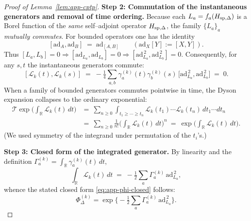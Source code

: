 \documentclass[10pt]{article}
\theoremstyle{definition}
\theoremstyle{plain}
\begin{document}
\begin{proof}[Proof of Lemma~\ref{lem:app-cptp}]
\medskip
\noindent\textbf{Step 2: Commutation of the instantaneous generators and removal of time ordering.}
Because each \(L_a=f_a(H_{{\rm sp},\Delta})\) is a Borel function of the \emph{same} self–adjoint operator
\(H_{{\rm sp},\Delta}\), the family \(\{L_a\}_a\) \emph{mutually commutes}.
For bounded operators one has the identity
\[
[\mathrm{ad}_A,\mathrm{ad}_B]\;=\;\mathrm{ad}_{[A,B]}\qquad(\mathrm{ad}_X[Y]:=[X,Y]).
\]
Thus \([L_a,L_b]=0\Rightarrow [\mathrm{ad}_{L_a},\mathrm{ad}_{L_b}]=0\Rightarrow
[\mathrm{ad}_{L_a}^{\,2},\mathrm{ad}_{L_b}^{\,2}]=0\).
Consequently, for any \(s,t\) the instantaneous generators commute:
\[
[\mathcal L_k(t),\mathcal L_k(s)]\;=\;-\tfrac14\sum_{a,b}\gamma_a^{(k)}(t)\gamma_b^{(k)}(s)\,
\big[\mathrm{ad}_{L_a}^{\,2},\mathrm{ad}_{L_b}^{\,2}\big]\;=\;0.
\]
When a family of bounded generators commutes pointwise in time, the Dyson expansion collapses to the ordinary exponential:
\begin{align*}
\mathcal T\exp\!\Big(\int_{\mathbb R}\!\mathcal L_k(t)\,dt\Big)
&=\ \sum_{n\ge 0}\int_{t_1\ge\cdots\ge t_n}\!\!\!\!\!\!
\mathcal L_k(t_1)\cdots \mathcal L_k(t_n)\,dt_1\cdots dt_n\\
&=\ \sum_{n\ge 0}\frac{1}{n!}\Big(\int_{\mathbb R}\!\mathcal L_k(t)\,dt\Big)^{\!n}
\ =\ \exp\!\Big(\int_{\mathbb R}\!\mathcal L_k(t)\,dt\Big).
\end{align*}
(We used symmetry of the integrand under permutation of the \(t_i\)'s.)

\medskip
\noindent\textbf{Step 3: Closed form of the integrated generator.}
By linearity and the definition \(\Gamma_a^{(k)}=\int_{\mathbb R}\gamma_a^{(k)}(t)\,dt\),
\[
\int_{\mathbb R}\!\mathcal L_k(t)\,dt
\;=\;-\tfrac12\sum_a \Gamma_a^{(k)}\,\mathrm{ad}_{L_a}^{\,2},
\]
whence the stated closed form \eqref{eq:app-phi-closed} follows:
\[
\Phi_\Delta^{(k)}=\exp\!\Big\{-\tfrac12\sum_a \Gamma_a^{(k)}\,\mathrm{ad}_{L_a}^{\,2}\Big\}.
\]


\end{proof}
\end{document}
